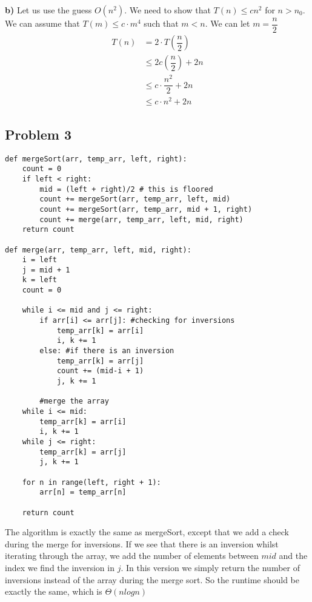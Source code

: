 \documentclass[12pt]{article}
\begin{document}
\textbf{b)}
Let us use the guess $O(n^2)$. We need to show that $T(n) \leq cn^2$ for $n > n_0$. We can assume that $T(m) \leq c \cdot m^4$ such that $m < n$. We can let $m = \dfrac{n}{2}$
\begin{align*}
T(n) &= 2 \cdot T(\dfrac{n}{2})\\
&\leq 2c(\dfrac{n}{2}) + 2n\\
&\leq c \cdot \dfrac{n^2}{2} + 2n\\
&\leq c \cdot n^2 + 2n
\end{align*}
\newpage



\subsection*{Problem 3}
\begin{verbatim} 
def mergeSort(arr, temp_arr, left, right):
    count = 0
    if left < right:
        mid = (left + right)/2 # this is floored
        count += mergeSort(arr, temp_arr, left, mid)
        count += mergeSort(arr, temp_arr, mid + 1, right)
        count += merge(arr, temp_arr, left, mid, right)
    return count
 
def merge(arr, temp_arr, left, mid, right):
    i = left
    j = mid + 1  
    k = left
    count = 0
 
    while i <= mid and j <= right:
        if arr[i] <= arr[j]: #checking for inversions
            temp_arr[k] = arr[i]
            i, k += 1
        else: #if there is an inversion
            temp_arr[k] = arr[j]
            count += (mid-i + 1)
            j, k += 1
            
 		#merge the array
    while i <= mid:
        temp_arr[k] = arr[i]
        i, k += 1
    while j <= right:
        temp_arr[k] = arr[j]
        j, k += 1

    for n in range(left, right + 1):
        arr[n] = temp_arr[n]
        
    return count
\end{verbatim}
The algorithm is exactly the same as mergeSort, except that we add a check during the merge for inversions. If we see that there is an inversion whilst iterating through the array, we add the number of elements between $mid$ and the index we find the inversion in $j$. In this version we simply return the number of inversions instead of the array during the merge sort. So the runtime should be exactly the same, which is $\Theta(n log n)$

\newpage
\end{document}
